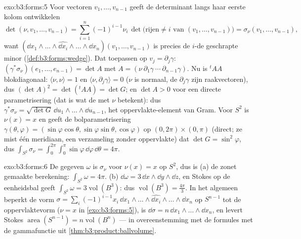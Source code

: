 \begin{solution}{exo:b3:forms:5}
Voor vectoren $v_1, \dots, v_{n-1}$ geeft de determinant langs
haar eerste kolom ontwikkelen
\[
\det(\nu, v_1, \dots, v_{n-1}) =
\sum_{i=1}^n(-1)^{i-1}\nu_i\,
\det\bigl(\text{rijen} \neq i \text{ van } (v_1, \dots,
v_{n-1})\bigr)
= \sigma_\nu(v_1, \dots, v_{n-1}),
\]
want $(\dd x_1\wedge\dots\wedge\widehat{\dd
x_i}\wedge\dots\wedge\dd x_n)(v_1, \dots, v_{n-1})$ is precies de
$i$-de geschrapte minor (\cref{def:b3:forms:wedge}). Dat
toepassen op $v_j = \partial_j\gamma$: $(\gamma^*\sigma_\nu)(e_1,
\dots, e_{n-1}) = \det A$ met $A = (\nu\ \partial_1\gamma\
\cdots\ \partial_{n-1}\gamma)$. Nu is ${}^t\!AA$ blokdiagonaal:
$\langle\nu, \nu\rangle = 1$ en $\langle\nu,
\partial_j\gamma\rangle = 0$ ($\nu$ is normaal, de
$\partial_j\gamma$ zijn raakvectoren), dus $(\det A)^2 =
\det({}^t\!AA) = \det G$; en $\det A > 0$ voor een directe
parametrisering (dat is wat de  met $\nu$ betekent):
dus $\gamma^*\sigma_\nu = \sqrt{\det G}\,\dd u_1\wedge\dots\wedge
\dd u_{n-1}$, het oppervlakte-element van Gram. Voor $S^2$ is
$\nu(x) = x$ en geeft de bolparametrisering $\gamma(\theta,
\varphi) = (\sin\varphi\cos\theta, \sin\varphi\sin\theta,
\cos\varphi)$ op $(0,2\pi)\times(0,\pi)$ (direct; ze mist één
meridiaan, een verzameling zonder oppervlakte) dat $\det G =
\sin^2\varphi$, dus $\int_{S^2}\sigma_\nu =
\int_0^{2\pi}\!\!\int_0^\pi\sin\varphi\,\dd\varphi\, \dd\theta =
4\pi$.
\end{solution}

\begin{solution}{exo:b3:forms:6}
De gegeven $\omega$ is $\sigma_\nu$ voor $\nu(x) = x$ op $S^2$,
dus is (a) de zonet gemaakte berekening: $\int_{S^2}\omega =
4\pi$. (b) $\dd\omega = 3\,\dd x\wedge\dd y\wedge\dd z$, en
Stokes op de eenheidsbal geeft $\int_{S^2}\omega =
3\operatorname{vol}(B^3)$: dus $\operatorname{vol}(B^3) =
\frac{4\pi}3$. In het algemeen beperkt de vorm $\sigma =
\sum_i(-1)^{i-1}x_i\,\dd x_1\wedge\dots\wedge\widehat{\dd
x_i}\wedge\dots\wedge\dd x_n$ op $S^{n-1}$ tot de
oppervlaktevorm ($\nu = x$ in \cref{exo:b3:forms:5}), is
$\dd\sigma = n\,\dd x_1\wedge\dots\wedge\dd x_n$, en levert
Stokes $\operatorname{area}(S^{n-1}) = n\operatorname{vol}(B^n)$
--- in overeenstemming met de formules met de gammafunctie uit
\cref{thm:b3:product:ballvolume}.
\end{solution}

